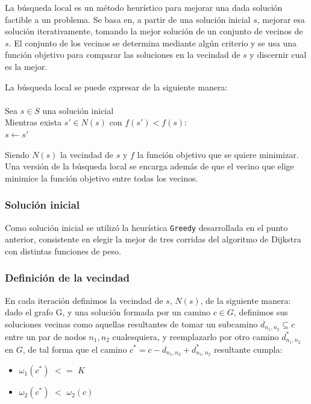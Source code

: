 La búsqueda local es un método heurístico para mejorar una dada solución factible a un problema. Se basa en, a partir de  una solución inicial $s$, mejorar esa solución iterativamente, tomando la mejor solución de un conjunto de vecinos de $s$. El conjunto de los vecinos se determina mediante algún criterio y se usa una función objetivo para comparar las soluciones en la vecindad de $s$ y discernir cual es la mejor.

La búsqueda local se puede expresar de la siguiente manera:\\\\
\hspace*{1 cm} Sea $s \in S$ una solución inicial\\
\hspace*{1 cm} Mientras exista $s' \in N(s)$ con $f(s') < f(s)$:\\
\hspace*{2 cm} $s \leftarrow s'$

Siendo $N(s)$ la vecindad de $s$ y $f$ la función objetivo que se quiere minimizar. Una versión de la búsqueda local se encarga además de que el vecino que elige minimice la función objetivo entre todas los vecinos.

\subsubsection{Solución inicial}

Como solución inicial se utilizó la heurística \texttt{Greedy} desarrollada en el punto anterior, consistente en elegir la mejor de tres corridas del algoritmo de Dijkstra con distintas funciones de peso.

\subsubsection{Definición de la vecindad}

En cada iteración definimos la vecindad de $s$, $N(s)$, de la siguiente manera: dado el grafo G, y una solución formada por un camino $c \in G$, definimos sus soluciones vecinas como aquellas resultantes de tomar un subcamino $d_{n_1,n_2} \subseteq c$ entre un par de nodos $n_1,n_2$ cualesquiera, y reemplazarlo por otro camino $d_{n_1,n_2}^*$ en $G$, de tal forma que el camino $c^* = c - d_{n_1,n_2} + d_{n_1,n_2}^*$ resultante cumpla: 

\begin{itemize}
\item $\omega_1(c^*)$ $<=$ $K$
\item $\omega_2(c^*)$ $<$ $\omega_2(c)$
\end{itemize}

